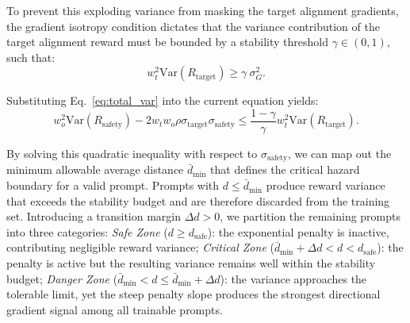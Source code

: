 To prevent this exploding variance from masking the target alignment gradients, the gradient isotropy condition dictates that the variance contribution of the target alignment reward must be bounded by a stability threshold $\gamma \in (0, 1)$, such that:
\begin{equation}
    w_t^2 \mathrm{Var}(R_{\mathrm{target}}) \geq \gamma\ \sigma_G^2.
\end{equation}

Substituting Eq.~\eqref{eq:total_var} into the current equation yields:
\begin{equation}
    w_o^2 \mathrm{Var}(R_{\mathrm{safety}}) - 2w_t w_o \rho \sigma_{\mathrm{target}}\sigma_{\mathrm{safety}} \le \frac{1-\gamma}{\gamma} w_t^2 \mathrm{Var}(R_{\mathrm{target}}).
\end{equation}

By solving this quadratic inequality with respect to $\sigma_{\mathrm{safety}}$, we can map out the minimum allowable average distance $\bar{d}_{\min}$ that defines the critical hazard boundary for a valid prompt. Prompts with $d \le \bar{d}_{\min}$ produce reward variance that exceeds the stability budget and are therefore discarded from the training set. Introducing a transition margin $\Delta d > 0$, we partition the remaining prompts into three categories:
\textit{Safe Zone} ($d \ge d_{\mathrm{safe}}$): the exponential penalty is inactive, contributing negligible reward variance;
\textit{Critical Zone} ($\bar{d}_{\min} + \Delta d < d < d_{\mathrm{safe}}$): the penalty is active but the resulting variance remains well within the stability budget;
\textit{Danger Zone} ($\bar{d}_{\min} < d \le \bar{d}_{\min} + \Delta d$): the variance approaches the tolerable limit, yet the steep penalty slope produces the strongest directional gradient signal among all trainable prompts.

